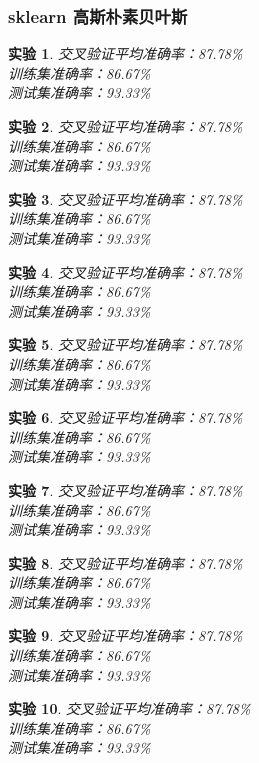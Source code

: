 \documentclass[cn,hazy,blue,14pt,normal]{elegantnote}
\newtheorem{train}{实验}
\begin{document}
\subsubsection{sklearn 高斯朴素贝叶斯}
\begin{train}交叉验证平均准确率：87.78\% \\  训练集准确率：86.67\% \\  测试集准确率：93.33\% \end{train}
\begin{train}交叉验证平均准确率：87.78\% \\  训练集准确率：86.67\% \\  测试集准确率：93.33\% \end{train}
\begin{train}交叉验证平均准确率：87.78\% \\  训练集准确率：86.67\% \\  测试集准确率：93.33\% \end{train}
\begin{train}交叉验证平均准确率：87.78\% \\  训练集准确率：86.67\% \\  测试集准确率：93.33\% \end{train}
\begin{train}交叉验证平均准确率：87.78\% \\  训练集准确率：86.67\% \\  测试集准确率：93.33\% \end{train}
\begin{train}交叉验证平均准确率：87.78\% \\  训练集准确率：86.67\% \\  测试集准确率：93.33\% \end{train}
\begin{train}交叉验证平均准确率：87.78\% \\  训练集准确率：86.67\% \\  测试集准确率：93.33\% \end{train}
\begin{train}交叉验证平均准确率：87.78\% \\  训练集准确率：86.67\% \\  测试集准确率：93.33\% \end{train}
\begin{train}交叉验证平均准确率：87.78\% \\  训练集准确率：86.67\% \\  测试集准确率：93.33\% \end{train}
\begin{train}交叉验证平均准确率：87.78\% \\  训练集准确率：86.67\% \\  测试集准确率：93.33\% \end{train}
\end{document}
